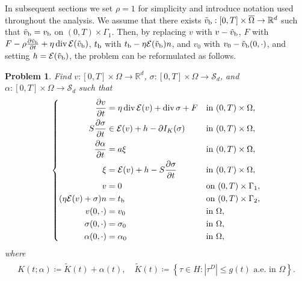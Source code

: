 \documentclass[11pt, a4paper]{article}
\newtheorem{problem}[Th]{Problem}
\newcommand{\R}{{\mathbb R}}
\newcommand{\Sym}{{\mathcal S}}
\newcommand{\ov}[1]{\overline{#1}}
\newcommand{\defeq}{\coloneqq}
\newcommand{\prz}[2]{ \frac{\partial{#1}}{\partial{#2}} }
\newcommand{\dvg}{\operatorname{div}}
\newcommand{\DS}{\displaystyle}
\newcommand{\E}{{\mathcal{E}}}
\newcommand{\Hs}{{H}}
\begin{document}
In subsequent sections we set $\rho=1$ for simplicity and introduce notation used throughout the analysis.
We assume that there exists $\tilde{v}_{\rm b}:[0,T]\times\ov{\Omega}\rightarrow\R^d$ such that $\tilde{v}_{\rm b} = v_{\rm b}$ on $(0,T)\times\Gamma_1$. Then, by replacing
    $v$ with $v-\tilde{v}_{\rm b}$,
    $F$ with $F - \rho\prz{\tilde{v}_{\rm b}}{t} + \eta\dvg\E(\tilde{v}_{\rm b})$,
    $t_{\rm b}$ with $t_{\rm b} - \eta\E(\tilde{v}_{\rm b})n$, and
    $v_0$ with $v_0 - \tilde{v}_{\rm b}(0,\cdot)$,
and setting $h=\E(\tilde{v}_{\rm b})$, the problem can be reformulated as follows.

\begin{problem}\label{Prob}
    Find 
        $v:[0,T]\times\Omega\rightarrow\R^d$,
        $\sigma:[0,T]\times\Omega\rightarrow\Sym_d$, and
        $\alpha:[0,T]\times\Omega\rightarrow\Sym_d$ 
    such that
    \begin{align*}
    \left\{\begin{aligned}
        \prz{v}{t} &= \eta\dvg\E(v) + \dvg\sigma + F &&\mbox{in }(0,T)\times\Omega,\\
        S\prz{\sigma}{t} &\in \E(v) + h - \partial I_K(\sigma) &&\mbox{in }(0,T)\times\Omega,\\
        \prz{\alpha}{t} &= a\xi
        &&\mbox{in }(0,T)\times\Omega,\\
        \xi &= \E(v)+h - S\prz{\sigma}{t}
        &&\mbox{in }(0,T)\times\Omega,\\
        v &=0 &&\mbox{on }(0,T)\times\Gamma_1,\\
        (\eta\E(v) + \sigma) n &=t_{\rm b} &&\mbox{on }(0,T)\times\Gamma_2,\\
        v(0,\cdot) &= v_0 &&\mbox{in }\Omega,\\
        \sigma(0,\cdot) &= \sigma_0 &&\mbox{in }\Omega,\\
        \alpha(0,\cdot) &= \alpha_0 &&\mbox{in }\Omega,\\
    \end{aligned}\right.
    \end{align*}
    where 
    \begin{align*}\begin{array}{c}
        {\DS K(t;\alpha) \defeq \tilde{K}(t) + \alpha(t),\quad 
        \tilde{K}(t) \defeq \left\{\tau\in\Hs : |\tau^D|\le g(t)\mbox{ a.e. in }\Omega\right\}.}
    \end{array}\end{align*}
\end{problem}
\end{document}
